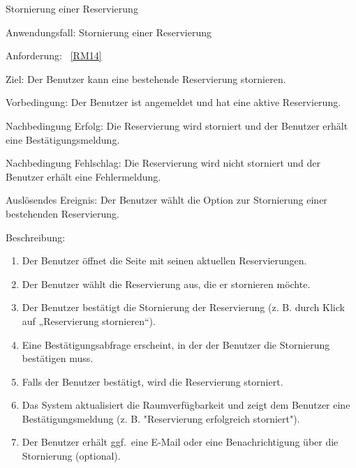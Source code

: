 \begin{function}{80}{Stornierung einer Reservierung}
    \item[Anwendungsfall:] Stornierung einer Reservierung
    \item[Anforderung:] ~\ref{RM14}
    \item[Ziel:] Der Benutzer kann eine bestehende Reservierung stornieren.
    \item[Vorbedingung:] Der Benutzer ist angemeldet und hat eine aktive Reservierung.
    \item[Nachbedingung Erfolg:] Die Reservierung wird storniert und der Benutzer erhält eine Bestätigungsmeldung.
    \item[Nachbedingung Fehlschlag:] Die Reservierung wird nicht storniert und der Benutzer erhält eine Fehlermeldung.
    \item[Auslösendes Ereignis:] Der Benutzer wählt die Option zur Stornierung einer bestehenden Reservierung.
    \item[Beschreibung:] ~
    \begin{enumerate}
        \item Der Benutzer öffnet die Seite mit seinen aktuellen Reservierungen.
        \item Der Benutzer wählt die Reservierung aus, die er stornieren möchte.
        \item Der Benutzer bestätigt die Stornierung der Reservierung (z. B. durch Klick auf „Reservierung stornieren“).
        \item Eine Bestätigungsabfrage erscheint, in der der Benutzer die Stornierung bestätigen muss.
        \item Falls der Benutzer bestätigt, wird die Reservierung storniert.
        \item Das System aktualisiert die Raumverfügbarkeit und zeigt dem Benutzer eine Bestätigungsmeldung (z. B. "Reservierung erfolgreich storniert").
        \item Der Benutzer erhält ggf.\ eine E-Mail oder eine Benachrichtigung über die Stornierung (optional).
    \end{enumerate}
\end{function}

